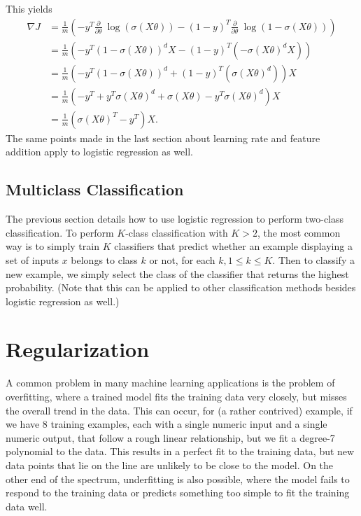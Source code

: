 \documentclass{article}
\begin{document}
This yields
\begin{align*}
\nabla J &= \frac{1}{m}\left(-y^T\frac{\partial}{\partial \theta}~ \log(\sigma(X\theta)) - (1-y)^T\frac{\partial}{\partial \theta}~\log(1-\sigma(X\theta))\right)\\
&= \frac{1}{m}\left(-y^T(1 - \sigma(X\theta))^dX - (1-y)^T(-\sigma(X\theta)^dX)\right)\\
&= \frac{1}{m}\left(-y^T(1 - \sigma(X\theta))^d + (1-y)^T(\sigma(X\theta)^d)\right)X\\
&= \frac{1}{m}\left(-y^T + y^T\sigma(X\theta)^d + \sigma(X\theta) - y^T\sigma(X\theta)^d\right)X\\
&= \frac{1}{m}(\sigma(X\theta)^T - y^T)X.
\end{align*}
The same points made in the last section about learning rate and feature addition apply to logistic regression as well.

\subsection{Multiclass Classification}
The previous section details how to use logistic regression to perform two-class classification. To perform $K$-class classification with $K>2$, the most common way is to simply train $K$ classifiers that predict whether an example displaying a set of inputs $x$ belongs to class $k$ or not, for each $k, 1 \le k \le K$. Then to classify a new example, we simply select the class of the classifier that returns the highest probability. (Note that this can be applied to other classification methods besides logistic regression as well.)

\section{Regularization}
A common problem in many machine learning applications is the problem of overfitting, where a trained model fits the training data very closely, but misses the overall trend in the data. This can occur, for (a rather contrived) example, if we have 8 training examples, each with a single numeric input and a single numeric output, that follow a rough linear relationship, but we fit a degree-7 polynomial to the data. This results in a perfect fit to the training data, but new data points that lie on the line are unlikely to be close to the model. On the other end of the spectrum, underfitting is also possible, where the model fails to respond to the training data or predicts something too simple to fit the training data well.
\end{document}
